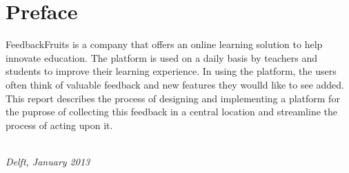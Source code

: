 \chapter*{Preface}

FeedbackFruits is a company that offers an online learning solution to help innovate education. The platform is used on a daily basis by teachers and students to improve their learning experience. In using the platform, the users often think of valuable feedback and new features they woulld like to see added. This report describes the process of designing and implementing a platform for the puprose of collecting this feedback in a central location and streamline the process of acting upon it.

\begin{flushright}
{\makeatletter\itshape
    \@author \\
    Delft, January 2013
\makeatother}
\end{flushright}

